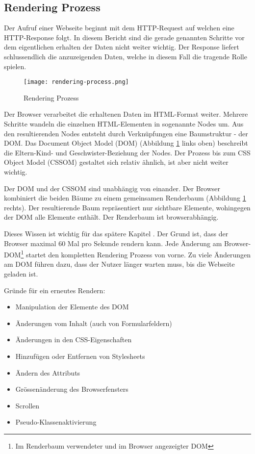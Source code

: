 \subsection{Rendering Prozess}
\label{sec:structureRendering}

Der Aufruf einer Webseite beginnt mit dem HTTP-Request auf welchen eine HTTP-Response folgt. 
In diesem Bericht sind die gerade genannten Schritte vor dem eigentlichen erhalten der Daten nicht weiter wichtig. 
Der Response liefert schlussendlich die anzuzeigenden Daten, welche in diesem Fall die tragende Rolle spielen. 

\begin{figure}[!htb]
    \centering
    \texttt{[image: rendering-process.png]}
    \caption{\centering Rendering Prozess}
    \label{img:renderingProcess}
\end{figure}

Der Browser verarbeitet die erhaltenen Daten im HTML-Format weiter. 
Mehrere Schritte wandeln die einzelnen HTML-Elementen in sogenannte Nodes um. 
Aus den resultierenden Nodes entsteht durch Verknüpfungen eine Baumstruktur - der DOM. 
Das Document Object Model (DOM) (Abbildung \ref{img:renderingProcess} links oben) beschreibt die Eltern-Kind- und Geschwister-Beziehung der Nodes. 
Der Prozess bis zum CSS Object Model (CSSOM) gestaltet sich relativ ähnlich, ist aber nicht weiter wichtig. 

Der DOM und der CSSOM sind unabhängig von einander. 
Der Browser kombiniert die beiden Bäume zu einem gemeinsamen Renderbaum (Abbildung \ref{img:renderingProcess} rechts). 
Der resultierende Baum repräsentiert nur sichtbare Elemente, wohingegen der DOM alle Elemente enthält. 
Der Renderbaum ist browserabhängig. 

Dieses Wissen ist wichtig für das spätere Kapitel \textbf{}. 
Der Grund ist, dass der Browser maximal 60 Mal pro Sekunde rendern kann. 
Jede Änderung am Browser-DOM\footnote{
    Im Renderbaum verwendeter und im Browser angezeigter DOM
} startet den kompletten Rendering Prozess von vorne. 
Zu viele Änderungen am DOM führen dazu, dass der Nutzer länger warten muss, bis die Webseite geladen ist. 

Gründe für ein erneutes Rendern:

\begin{itemize}
    \item Manipulation der Elemente des DOM
    \item Änderungen vom Inhalt (auch von Formularfeldern)
    \item Änderungen in den CSS-Eigenschaften
    \item Hinzufügen oder Entfernen von Stylesheets
    \item Ändern des Attributs 
    \item Grössenänderung des Browserfensters
    \item Scrollen
    \item Pseudo-Klassenaktivierung
\end{itemize}


